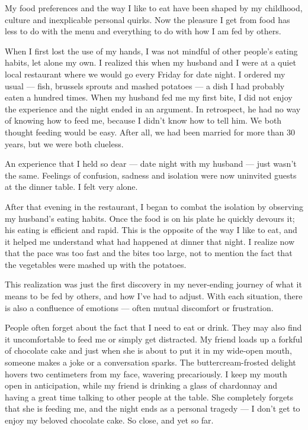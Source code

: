 My food preferences and the way I like to eat have been shaped by my
childhood, culture and inexplicable personal quirks. Now the pleasure I
get from food has less to do with the menu and everything to do with how
I am fed by others.

When I first lost the use of my hands, I was not mindful of other
people's eating habits, let alone my own. I realized this when my
husband and I were at a quiet local restaurant where we would go every
Friday for date night. I ordered my usual --- fish, brussels sprouts and
mashed potatoes --- a dish I had probably eaten a hundred times. When my
husband fed me my first bite, I did not enjoy the experience and the
night ended in an argument. In retrospect, he had no way of knowing how
to feed me, because I didn't know how to tell him. We both thought
feeding would be easy. After all, we had been married for more than 30
years, but we were both clueless.

An experience that I held so dear --- date night with my husband ---
just wasn't the same. Feelings of confusion, sadness and isolation were
now uninvited guests at the dinner table. I felt very alone.

After that evening in the restaurant, I began to combat the isolation by
observing my husband's eating habits. Once the food is on his plate he
quickly devours it; his eating is efficient and rapid. This is the
opposite of the way I like to eat, and it helped me understand what had
happened at dinner that night. I realize now that the pace was too fast
and the bites too large, not to mention the fact that the vegetables
were mashed up with the potatoes.

This realization was just the first discovery in my never-ending journey
of what it means to be fed by others, and how I've had to adjust. With
each situation, there is also a confluence of emotions --- often mutual
discomfort or frustration.

People often forget about the fact that I need to eat or drink. They may
also find it uncomfortable to feed me or simply get distracted. My
friend loads up a forkful of chocolate cake and just when she is about
to put it in my wide-open mouth, someone makes a joke or a conversation
sparks. The buttercream-frosted delight hovers two centimeters from my
face, wavering precariously. I keep my mouth open in anticipation, while
my friend is drinking a glass of chardonnay and having a great time
talking to other people at the table. She completely forgets that she is
feeding me, and the night ends as a personal tragedy --- I don't get to
enjoy my beloved chocolate cake. So close, and yet so far.

